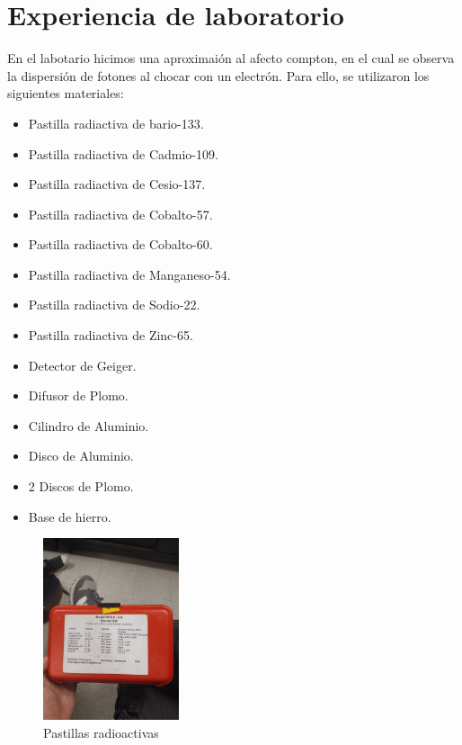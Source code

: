 \documentclass[a4paper]{article}
\begin{document}
    \newpage
    \noindent
    \thispagestyle{fancy}
        
    \section{Experiencia de laboratorio}

    \indent En el labotario hicimos una aproximaión al afecto compton, en el cual se observa la dispersión de fotones al chocar con un electrón. Para ello, se utilizaron los siguientes materiales:\\

    \begin{itemize}
        \item Pastilla radiactiva de bario-133.
        \item Pastilla radiactiva de Cadmio-109.
        \item Pastilla radiactiva de Cesio-137.
        \item Pastilla radiactiva de Cobalto-57.
        \item Pastilla radiactiva de Cobalto-60.
        \item Pastilla radiactiva de Manganeso-54.
        \item Pastilla radiactiva de Sodio-22.
        \item Pastilla radiactiva de Zinc-65.
        \item Detector de Geiger.
        \item Difusor de Plomo.
        \item Cilindro de Aluminio.
        \item Disco de Aluminio.
        \item 2 Discos de Plomo.
        \item Base de hierro.
    \end{itemize}

    \begin{figure}[h!]
        \centering
        \includegraphics[width=4cm, trim={0cm 1cm 0cm 2cm}, clip]{../imagenes/pastillasrad.jpg}
        \caption{Pastillas radioactivas}
    \end{figure}
\end{document}
